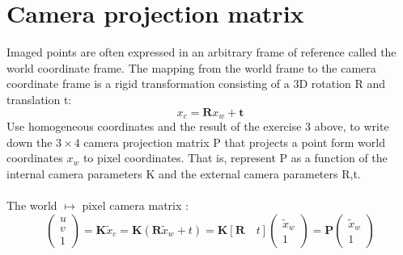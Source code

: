 \documentclass[a4paper,12pt]{article}
\begin{document}
\section{ Camera projection matrix}
Imaged points are often expressed in an arbitrary frame of reference called the world coordinate frame. The mapping from the world frame to the camera coordinate frame is a rigid transformation consisting of a 3D rotation R and translation t: $$x_c = \mathbf{R}x_w + \mathbf{t}$$ Use homogeneous coordinates and the result of the exercise 3 above, to write down the $3 \times 4$ camera projection matrix P that projects a point form world coordinates $x_w$ to pixel coordinates. That is, represent P as a function of the internal camera parameters K and the external camera parameters R,t.\\\\
The world $\mapsto$ pixel camera matrix :
$$\begin{pmatrix}
u\\v\\1
\end{pmatrix} = \mathbf{K}\tilde{x}_c = \mathbf{K}(\mathbf{R}\tilde{x}_w + t) = \mathbf{K}[\mathbf{R} \quad t]
\begin{pmatrix}
\tilde{x}_w\\1
\end{pmatrix} = \mathbf{P} 
\begin{pmatrix}
\tilde{x}_w\\1
\end{pmatrix}
$$ 
\end{document}
